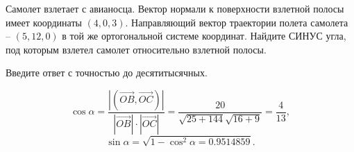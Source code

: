 
Самолет взлетает с авианосца. Вектор нормали к поверхности взлетной полосы имеет координаты $(4,0,3)$. 
Направляющий вектор траектории полета \linebreak самолета -- $(5,12,0)$ в той же ортогональной системе координат. 
Найдите СИНУС угла, под которым взлетел самолет относительно взлетной полосы.

Введите ответ с точностью до десятитысячных.

\soultionSection

$$\cos\alpha = \frac{|(\vec{OB}, \vec{OC})|}{|\vec{OB}|\cdot|\vec{OC}|} = \frac{20}{\sqrt{25+144}\sqrt{16+9}}= \frac{4}{13},$$
$$\sin\alpha = \sqrt{1 - \cos^2 \alpha = 0.9514859}.$$\\


